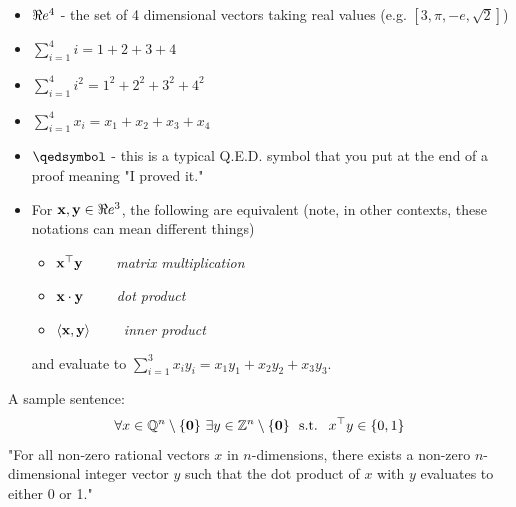 \begin{itemize}
\item $\Re e^4$ - the set of 4 dimensional vectors taking real values (e.g. $[3, \pi, -e, \sqrt{2}]$)
\item $\sum_{i=1}^4 i  = 1 + 2 + 3 + 4$
\item $\sum_{i=1}^4 i^2 = 1^2 + 2^2 + 3^2 + 4^2$
\item $\sum_{i=1}^4 x_i = x_1 + x_2 + x_3 + x_4$
\item $\qedsymbol$ - this is a typical Q.E.D. symbol that you put at the end of a proof meaning "I proved it."
\item For $\mathbf{x},\mathbf{y} \in \Re e^3$, the following are equivalent (note, in other contexts, these notations can mean different things)
\begin{itemize}
\item $\mathbf{x}^\top \mathbf{y}$ \ \ \ \ \emph{matrix multiplication}
\item $\mathbf{x} \cdot \mathbf{y}$ \ \ \ \ \emph{dot product}
\item $\langle \mathbf{x},\mathbf{y}\rangle$ \ \ \ \ \emph{inner product}
\end{itemize}
and evaluate to $\sum_{i=1}^3 x_i y_i = x_1 y_1 + x_2 y_2 + x_3 y_3$.
\end{itemize}

A sample sentence:
$$
\forall x \in \Q^n \setminus \{\mathbf{0}\} \ \exists y \in \Z^n\setminus \{\mathbf{0}\} \ \text{ s.t. } \ x^\top y \in \{0,1\}
$$
"For all non-zero rational vectors $x$ in $n$-dimensions, there exists a non-zero $n$-dimensional integer vector $y$ such that the dot product of $x$ with $y$ evaluates to either 0 or 1."

%
